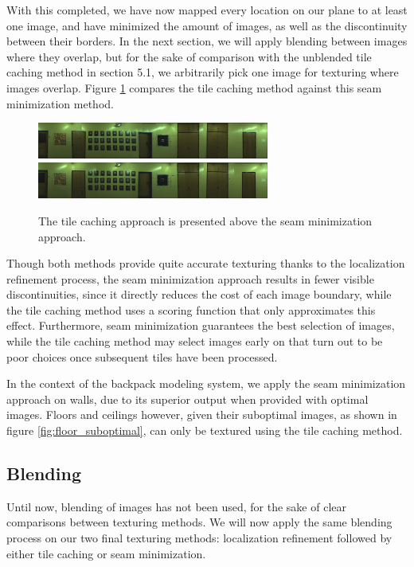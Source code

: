 \documentclass[10pt,twocolumn,letterpaper]{article}
\begin{document}
With this completed, we have now mapped every location on our plane to
at least one image, and have minimized the amount of images, as well
as the discontinuity between their borders. In the next section, we
will apply blending between images where they overlap, but for the
sake of comparison with the unblended tile caching method in section
5.1, we arbitrarily pick one image for texturing where images
overlap. Figure \ref{fig:compare_unblended} compares the tile caching
method against this seam minimization method.

\begin{figure}
  \centering
  \includegraphics[width=3in]{wall1_cache_full_shifted.jpg}
  \includegraphics[width=3in]{wall1_dynprog_noblend.jpg}
  \caption{The tile caching approach is presented above the seam
    minimization approach.}
  \label{fig:compare_unblended}
\end{figure}


Though both methods provide quite accurate texturing thanks to the
localization refinement process, the seam minimization approach
results in fewer visible discontinuities, since it directly reduces
the cost of each image boundary, while the tile caching method uses a
scoring function that only approximates this effect. Furthermore, seam
minimization guarantees the best selection of images, while the tile
caching method may select images early on that turn out to be poor
choices once subsequent tiles have been processed.

In the context of the backpack modeling system, we apply the seam
minimization approach on walls, due to its superior output when
provided with optimal images. Floors and ceilings however, given their
suboptimal images, as shown in figure \ref{fig:floor_suboptimal}, can
only be textured using the tile caching method.

\subsection{Blending}
Until now, blending of images has not been used, for the sake of clear
comparisons between texturing methods. We will now apply the same
blending process on our two final texturing methods: localization
refinement followed by either tile caching or seam minimization.
\end{document}
